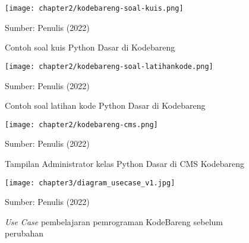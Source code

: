 
\begin{figure}[!h]
  \centering
  \texttt{[image: chapter2/kodebareng-soal-kuis.png]}
  \caption{Contoh soal kuis Python Dasar di Kodebareng}\label{fig:kodebareng-soal-kuis}
  Sumber: Penulis (2022)
\end{figure}

\begin{figure}[!h]
  \centering
  \texttt{[image: chapter2/kodebareng-soal-latihankode.png]}
  \caption{Contoh soal latihan kode Python Dasar di Kodebareng}\label{fig:kodebareng-soal-latihankode}
  Sumber: Penulis (2022)
\end{figure}


\begin{figure}[!h]
  \centering
  \texttt{[image: chapter2/kodebareng-cms.png]}
  \caption{Tampilan Administrator kelas Python Dasar di CMS Kodebareng}\label{fig:kodebareng-cms}
  Sumber: Penulis (2022)
\end{figure}


\begin{figure}[!h]
  \centering
  \texttt{[image: chapter3/diagram\_usecase\_v1.jpg]}
  \caption{\textit{Use Case} pembelajaran pemrograman KodeBareng sebelum perubahan} \label{fig:diagram-usecase-v1}
  Sumber: Penulis (2022)
\end{figure}